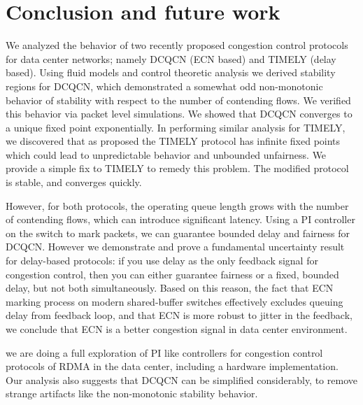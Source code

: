 \vspace{-0.5em}
\section{Conclusion and future work}
We analyzed  the behavior of two recently proposed congestion control protocols
for data center networks; namely DCQCN (ECN based) and TIMELY (delay based).
Using fluid models and control theoretic analysis we derived stability regions
for DCQCN, which demonstrated a somewhat odd non-monotonic behavior of stability
with respect to the number of contending flows. We verified this behavior via
packet level simulations. We showed that DCQCN converges to a unique
fixed point exponentially. In performing similar analysis for TIMELY, we discovered that as proposed
the TIMELY protocol has infinite fixed points which could lead to unpredictable
behavior and unbounded unfairness. We provide a simple fix to TIMELY to remedy
this problem. The modified protocol is stable, and converges quickly.

However, for both protocols, the operating queue length grows with the number of
contending flows, which can introduce significant latency. Using a PI controller
on the switch to mark packets, we can guarantee bounded delay and fairness for
DCQCN.  However we demonstrate and prove a fundamental uncertainty result for
delay-based protocols: if you use delay as the only feedback signal for
congestion control, then you can either guarantee fairness or a fixed,
bounded delay,
but not both simultaneously. Based on this reason, the fact that ECN marking
process on modern shared-buffer switches effectively excludes queuing delay from
feedback loop, and that ECN is more robust to jitter in the feedback,
we conclude that ECN is a better congestion signal in data center 
environment. 

 we are doing a full exploration of PI like controllers for
congestion control protocols of RDMA in the data center, including a hardware
implementation. Our analysis also suggests that DCQCN can be simplified
considerably, to remove strange artifacts like the non-monotonic stability
behavior. 



